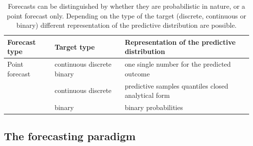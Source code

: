 \documentclass[article,shortnames]{jss}
\begin{document}
\begin{table}[h!]
\centering
\begin{longtable}[t]{>{\raggedright\arraybackslash}p{3.5cm}>{\raggedright\arraybackslash}p{2.5cm}>{\raggedright\arraybackslash}p{4.5cm}}
\toprule
\textbf{Forecast type} & \textbf{Target type} & \textbf{Representation of the predictive distribution}\\
\midrule
Point forecast & continuous \newline  discrete \newline  binary & one single number for the predicted outcome\\
\cmidrule{1-3}\pagebreak[0]
 & continuous \newline  discrete & predictive samples \newline   quantiles \newline   closed analytical form\\
\cmidrule{2-3}\nopagebreak
\multirow{-2}{3.5cm}{\raggedright\arraybackslash Probabilistic forecast} & binary & binary probabilities\\
\bottomrule
\end{longtable}\caption{\label{tab:forecast-types} Forecasts can be distinguished by whether they are probabilistic in nature, or a point forecast only. Depending on the type of the target (discrete, continuous or binary) different representation of the predictive distribution are possible.} 
\end{table}


\subsection{The forecasting paradigm}
\end{document}
